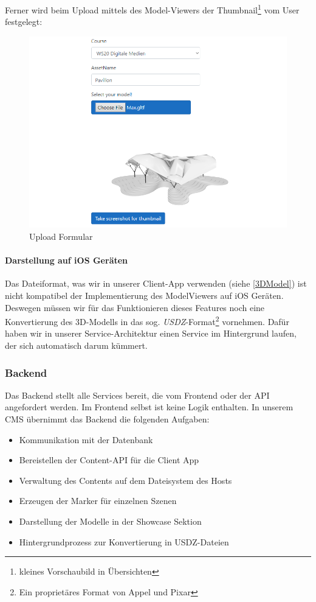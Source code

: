 \documentclass[titlepage, a4paper, 11pt]{scrartcl}
\begin{document}
          Ferner wird beim Upload mittels des Model-Viewers der Thumbnail\footnote{kleines Vorschaubild in Übersichten} vom User festgelegt:
          
          \begin{figure}[H]
            \centering
            \includegraphics[width=.6\textwidth]{UploadForm.PNG}
            \caption{Upload Formular}
            \label{createThumb}
          \end{figure}

        \paragraph{Darstellung auf iOS Geräten}

          Das Dateiformat, was wir in unserer Client-App verwenden (siehe \ref{3DModel}) ist nicht kompatibel der Implementierung des ModelViewers auf iOS Geräten.
          Deswegen müssen wir für das Funktionieren dieses Features noch eine Konvertierung des 3D-Modells in das sog. \textit{USDZ}-Format\footnote{Ein proprietäres Format von Appel und Pixar} vornehmen.
          Dafür haben wir in unserer Service-Architektur einen Service im Hintergrund laufen, der sich automatisch darum kümmert.

      \subsubsection{Backend}

        Das Backend stellt alle Services bereit, die vom Frontend oder der API angefordert werden. Im Frontend selbst ist keine Logik enthalten. 
        In unserem CMS übernimmt das Backend die folgenden Aufgaben:

        \begin{itemize}
          \item Kommunikation mit der Datenbank
          \item Bereistellen der Content-API für die Client App
          \item Verwaltung des Contents auf dem Dateisystem des Hosts
          \item Erzeugen der Marker für einzelnen Szenen
          \item Darstellung der Modelle in der Showcase Sektion
          \item Hintergrundprozess zur Konvertierung in USDZ-Dateien
        \end{itemize}
\end{document}
